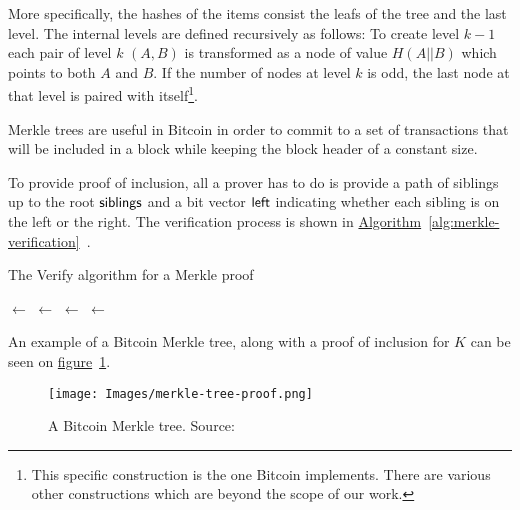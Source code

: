 More specifically, the hashes of the items consist the leafs of the tree and the last level. The internal levels are defined recursively as follows: To create level $k-1$ each pair of level $k$ $(A, B)$ is transformed as a node of value $H(A || B)$ which points to both $A$ and $B$. If the number of nodes at level $k$ is odd, the last node at that level is paired with itself\footnote{This specific construction is the one Bitcoin implements. There are various other constructions which are beyond the scope of our work.}.

Merkle trees are useful in Bitcoin in order to commit to a set of transactions that will be included in a block while keeping the block header of a constant size.

To provide proof of inclusion, all a prover has to do is provide a path of siblings up to the root $\sf{siblings}$ and a bit vector $\sf{left}$ indicating whether each sibling is on the left or the right. The verification process is shown in \hyperref[alg:merkle-verification]{Algorithm}~\ref{alg:merkle-verification}~\cite{gtklocker}.
\vspace{0.3cm}
\begin{algorithm}
  \caption{\label{alg:merkle-verification}The \textsf{Verify} algorithm
    for a Merkle proof}
    \begin{algorithmic}[1]
            \State {}$\gets$
              \State {}$\gets$
                \State {}$\gets$
              \Else
                \State {}$\gets$
              \EndIf
            \EndWhile
            \State{}
        \EndFunction
    \end{algorithmic}
\end{algorithm}

An example of a Bitcoin Merkle tree, along with a proof of inclusion for $K$ can be seen on \hyperref[fig:merkletree]{figure}~\ref{fig:merkletree}.

\begin{figure}[ht!]{\label{fig:merkletree}}
  \centering
  \texttt{[image: Images/merkle-tree-proof.png]}
  \caption{A Bitcoin Merkle tree. Source:~\cite{mastering}}
\end{figure}
%
